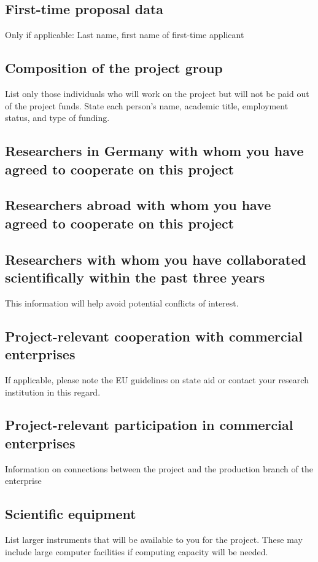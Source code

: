 \documentclass[11pt,a4paper]{article}
\begin{document}
\subsection{First-time proposal data}
Only if applicable: Last name, first name of first-time applicant


\subsection{Composition of the project group}
List only those individuals who will work on the project but will not be paid out of the project funds. State each person’s name, academic title, employment status, and type of funding.


\subsection{Researchers in Germany with whom you have agreed to cooperate on this project}


\subsection{Researchers abroad with whom you have agreed to cooperate on this project}

\subsection{Researchers with whom you have collaborated scientifically within the past three years}
This information will help avoid potential conflicts of interest.


\subsection{Project-relevant cooperation with commercial enterprises}
If applicable, please note the EU guidelines on state aid or contact your research institution in this regard.


\subsection{Project-relevant participation in commercial enterprises}
Information on connections between the project and the production branch of the enterprise


\subsection{Scientific equipment}
List larger instruments that will be available to you for the project. These may include large computer facilities if computing capacity will be needed. 
\end{document}
